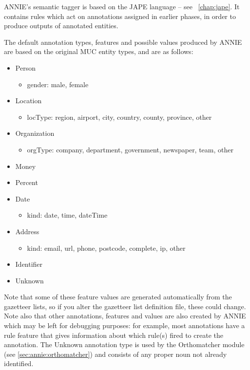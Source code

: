
ANNIE's semantic tagger is based on the JAPE language -- see \Chapthing\
\ref{chap:jape}. It contains rules which act on annotations
assigned in earlier phases, in order to produce outputs of annotated
entities.

The default annotation types, features and possible values produced by ANNIE are based on the original MUC entity types, and are as follows:
\begin{itemize}
\item Person
	\begin{itemize}
	\item gender: male, female
	\end{itemize}
\item Location
	\begin{itemize}
	\item locType: region, airport, city, country, county, province, other
	\end{itemize}
\item Organization
	\begin{itemize}
	\item orgType: company, department, government, newspaper, team, other
	\end{itemize}
\item Money
\item Percent
\item Date
	\begin{itemize}
	\item kind: date, time, dateTime
	\end{itemize}
\item Address
	\begin{itemize}
	\item kind: email, url, phone, postcode, complete, ip, other
	\end{itemize}
\item Identifier
\item Unknown
\end{itemize}

Note that some of these feature values are generated automatically from the gazetteer lists, so if you alter the gazetteer list definition file, these could change. Note also that other annotations, features and values are also created by ANNIE which may be left for debugging purposes: for example, most annotations have a rule feature that gives information about which rule(s) fired to create the annotation.
The Unknown annotation type is used by the Orthomatcher module (see \ref{sec:annie:orthomatcher}) and consists of any proper noun not already identified.



